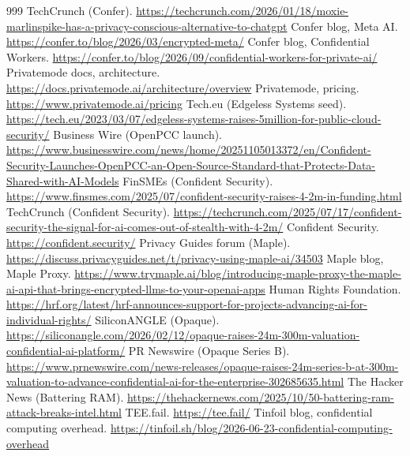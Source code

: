\documentclass[10pt,a4paper]{article}
\begin{document}
\begin{thebibliography}{999}
 TechCrunch (Confer). \url{https://techcrunch.com/2026/01/18/moxie-marlinspike-has-a-privacy-conscious-alternative-to-chatgpt}
 Confer blog, Meta AI. \url{https://confer.to/blog/2026/03/encrypted-meta/}
 Confer blog, Confidential Workers. \url{https://confer.to/blog/2026/09/confidential-workers-for-private-ai/}
 Privatemode docs, architecture. \url{https://docs.privatemode.ai/architecture/overview}
 Privatemode, pricing. \url{https://www.privatemode.ai/pricing}
 Tech.eu (Edgeless Systems seed). \url{https://tech.eu/2023/03/07/edgeless-systems-raises-5million-for-public-cloud-security/}
 Business Wire (OpenPCC launch). \url{https://www.businesswire.com/news/home/20251105013372/en/Confident-Security-Launches-OpenPCC-an-Open-Source-Standard-that-Protects-Data-Shared-with-AI-Models}
 FinSMEs (Confident Security). \url{https://www.finsmes.com/2025/07/confident-security-raises-4-2m-in-funding.html}
 TechCrunch (Confident Security). \url{https://techcrunch.com/2025/07/17/confident-security-the-signal-for-ai-comes-out-of-stealth-with-4-2m/}
 Confident Security. \url{https://confident.security/}
 Privacy Guides forum (Maple). \url{https://discuss.privacyguides.net/t/privacy-using-maple-ai/34503}
 Maple blog, Maple Proxy. \url{https://www.trymaple.ai/blog/introducing-maple-proxy-the-maple-ai-api-that-brings-encrypted-llms-to-your-openai-apps}
 Human Rights Foundation. \url{https://hrf.org/latest/hrf-announces-support-for-projects-advancing-ai-for-individual-rights/}
 SiliconANGLE (Opaque). \url{https://siliconangle.com/2026/02/12/opaque-raises-24m-300m-valuation-confidential-ai-platform/}
 PR Newswire (Opaque Series B). \url{https://www.prnewswire.com/news-releases/opaque-raises-24m-series-b-at-300m-valuation-to-advance-confidential-ai-for-the-enterprise-302685635.html}
 The Hacker News (Battering RAM). \url{https://thehackernews.com/2025/10/50-battering-ram-attack-breaks-intel.html}
 TEE.fail. \url{https://tee.fail/}
 Tinfoil blog, confidential computing overhead. \url{https://tinfoil.sh/blog/2026-06-23-confidential-computing-overhead}

\end{thebibliography}
\end{document}
